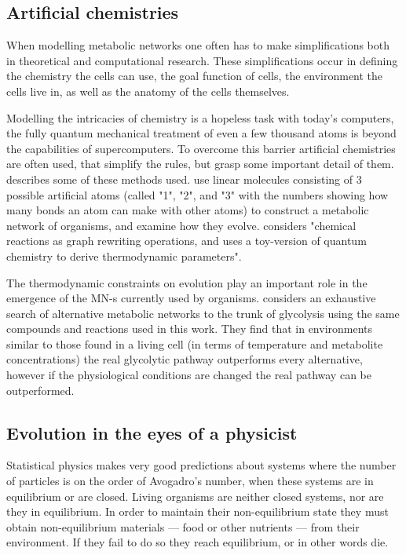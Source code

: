 \documentclass[a4paper,12pt]{article}
\begin{document}
	\subsection{Artificial chemistries}
	\label{sub:artificial_chemistries}


	When modelling metabolic networks one often has to make simplifications both in theoretical and computational research. These simplifications occur in defining the chemistry the cells can use, the goal function of cells, the environment the cells live in, as well as the anatomy of the cells themselves. %
	
	Modelling the intricacies of chemistry is a hopeless task with today's computers, the fully quantum mechanical treatment of even a few thousand atoms is beyond the capabilities of supercomputers. To overcome this barrier artificial chemistries are often used, that simplify the rules, but grasp some important detail of them. \cite{artificialreview} describes some of these methods used. \cite{evolutioncomplex} use linear molecules consisting of 3 possible  artificial atoms (called "1", "2", and "3" with the numbers showing how many bonds an atom can make with other atoms) to construct a metabolic network of organisms, and examine how they evolve. \cite{computationalframework} considers "chemical reactions as graph rewriting operations, and uses a toy-version of quantum chemistry to derive thermodynamic parameters". %
	
	The thermodynamic constraints on evolution play an important role in the emergence of the MN-s currently used by organisms. \cite{BartekLower} considers an exhaustive search of alternative metabolic networks to the trunk of glycolysis using the same compounds and reactions used in this work. They find that in environments similar to those found in a living cell (in terms of temperature and metabolite concentrations) the real glycolytic pathway outperforms every alternative, however if the physiological conditions are changed the real pathway can be outperformed.


	
	\subsection{Evolution in the eyes of a physicist}\label{chap:whereisphysics}

	Statistical physics makes very good predictions about systems where the number of particles is on the order of Avogadro's number, when these systems are in equilibrium or are closed. Living organisms are neither closed systems, nor are they in equilibrium. In order to maintain their non-equilibrium state they must obtain non-equilibrium materials --- food or other nutrients --- from their environment. If they fail to do so they reach equilibrium, or in other words die. \cite{irreversibility}
\end{document}
